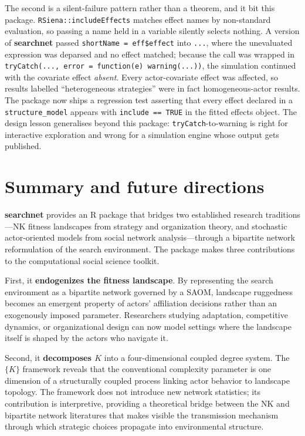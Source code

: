\documentclass[
]{article}
\begin{document}
The second is a silent-failure pattern rather than a theorem, and it bit
this package. \texttt{RSiena::includeEffects} matches effect names by
non-standard evaluation, so passing a name held in a variable silently
selects nothing. A version of \textbf{searchnet} passed
\texttt{shortName = eff\$effect} into \texttt{...}, where the
unevaluated expression was deparsed and no effect matched; because the
call was wrapped in
\texttt{tryCatch(..., error = function(e) warning(...))}, the simulation
continued with the covariate effect \emph{absent}. Every actor-covariate
effect was affected, so results labelled ``heterogeneous strategies''
were in fact homogeneous-actor results. The package now ships a
regression test asserting that every effect declared in a
\texttt{structure\_model} appears with \texttt{include == TRUE} in the
fitted effects object. The design lesson generalises beyond this
package: \texttt{tryCatch}-to-warning is right for interactive
exploration and wrong for a simulation engine whose output gets
published.

\section{Summary and future directions}\label{sec:conclusion}

\textbf{searchnet} provides an \textsf{R} package that bridges two
established research traditions---NK fitness landscapes from strategy
and organization theory, and stochastic actor-oriented models from
social network analysis---through a bipartite network reformulation of
the search environment. The package makes three contributions to the
computational social science toolkit.

First, it \textbf{endogenizes the fitness landscape}. By representing
the search environment as a bipartite network governed by a SAOM,
landscape ruggedness becomes an emergent property of actors' affiliation
decisions rather than an exogenously imposed parameter. Researchers
studying adaptation, competitive dynamics, or organizational design can
now model settings where the landscape itself is shaped by the actors
who navigate it.

Second, it \textbf{decomposes \(K\)} into a four-dimensional coupled
degree system. The \(\{K\}\) framework reveals that the conventional
complexity parameter is one dimension of a structurally coupled process
linking actor behavior to landscape topology. The framework does not
introduce new network statistics; its contribution is interpretive,
providing a theoretical bridge between the NK and bipartite network
literatures that makes visible the transmission mechanism through which
strategic choices propagate into environmental structure.
\end{document}
